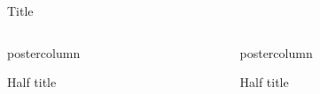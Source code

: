 \documentclass{beamer}
\begin{document}
\begin{frame}
\vspace{1.2ex}
\begin{UoMblock}{Title}
\Blindtext[2][5]
\cite{Doe11} \cite{JohSil05} \cite{Joh11}
\end{UoMblock}
\vspace{1.2ex}

\begin{columns}[t]
	\begin{column}{.47\textwidth}
		\begin{beamercolorbox}[center,wd=\textwidth]{postercolumn}
			\begin{UoMblock}[equal height group=B]{Half title}
				\Blindtext[3][4]
			\end{UoMblock}\vfill
		\end{beamercolorbox}
	\end{column}
	\hspace{12pt}
	\begin{column}{.47\textwidth}
		\begin{beamercolorbox}[center,wd=\textwidth]{postercolumn}
			\begin{UoMblock}[equal height group=B]{Half title}
				\Blindtext[3][4]
			\end{UoMblock}
		\end{beamercolorbox}
	\end{column}
\end{columns}

\vspace{1.5ex}


\end{frame}
\end{document}
